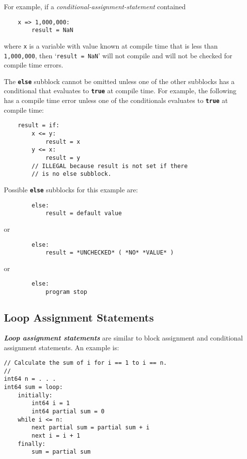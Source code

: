 \documentclass[12pt]{article}
\newcommand{\TT}[1]{{\tt \bfseries #1}}
\newcommand{\ikey}[2]{{\bf \em #1}\index{#2}}
\newenvironment{indpar}[1][0.3in]%
	{\begin{list}{}%
		     {\setlength{\itemsep}{0in}%
		      \setlength{\topsep}{0in}%
		      \setlength{\parsep}{1ex}%
		      \setlength{\labelwidth}{#1}%
		      \setlength{\leftmargin}{#1}%
		      \addtolength{\leftmargin}{\labelsep}}%
	 \item}%
	{\end{list}}
\begin{document}
For example, if a {\em conditional-assignment-statement}
contained
\begin{indpar}\begin{verbatim}
    x => 1,000,000:
        result = NaN
\end{verbatim}\end{indpar}
where {\tt x} is a variable with value known at compile time
that is less than {\tt 1,000,000}, then
`{\tt result = NaN}' will not compile
and will not be checked for compile time errors.

The \TT{else} subblock cannot be omitted unless one of the
other subblocks has a conditional that evaluates to \TT{true}
at compile time.  For
example, the following has a compile time error unless
one of the conditionals evaluates to \TT{true} at compile time:
\begin{indpar}\begin{verbatim}
    result = if:
        x <= y:
            result = x
        y <= x:
            result = y
        // ILLEGAL because result is not set if there
        // is no else subblock.
\end{verbatim}\end{indpar}
Possible \TT{else} subblocks for this example are:
\begin{indpar}\begin{verbatim}
        else:
            result = default value
\end{verbatim}\end{indpar}
or
\begin{indpar}\begin{verbatim}
        else:
            result = *UNCHECKED* ( *NO* *VALUE* )
\end{verbatim}\end{indpar}
or
\begin{indpar}\begin{verbatim}
        else:
            program stop
\end{verbatim}\end{indpar}

\subsection{Loop Assignment Statements}
\label{LOOP-ASSIGNMENT-STATEMENTS}

\ikey{Loop assignment statements}{loop assignment}
are similar to block assignment
and conditional assignment statements.  An example is:
\begin{indpar}\begin{verbatim}
// Calculate the sum of i for i == 1 to i == n.
//
int64 n = . . .
int64 sum = loop:
    initially:
        int64 i = 1
        int64 partial sum = 0
    while i <= n:
        next partial sum = partial sum + i
        next i = i + 1
    finally:
        sum = partial sum
\end{verbatim}\end{indpar}
\end{document}
